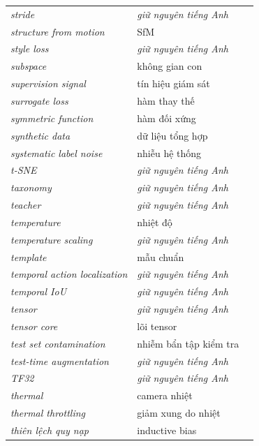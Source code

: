 \documentclass[deep_learning.tex]{subfiles}
\begin{document}
\begin{longtable}{@{}L{5.2cm}L{5.9cm}L{2.6cm}@{}}
\emph{stride} & \emph{\color{tiercol}giữ nguyên tiếng Anh} & \\
\emph{structure from motion} & SfM & \\
\emph{style loss} & \emph{\color{tiercol}giữ nguyên tiếng Anh} & \\
\emph{subspace} & không gian con & \\
\emph{supervision signal} & tín hiệu giám sát & \\
\emph{surrogate loss} & hàm thay thế & \\
\emph{symmetric function} & hàm đối xứng & \\
\emph{synthetic data} & dữ liệu tổng hợp & \\
\emph{systematic label noise} & nhiễu hệ thống & \\
\emph{t-SNE} & \emph{\color{tiercol}giữ nguyên tiếng Anh} & \\
\emph{taxonomy} & \emph{\color{tiercol}giữ nguyên tiếng Anh} & \\
\emph{teacher} & \emph{\color{tiercol}giữ nguyên tiếng Anh} & \\
\emph{temperature} & nhiệt độ & \\
\emph{temperature scaling} & \emph{\color{tiercol}giữ nguyên tiếng Anh} & \\
\emph{template} & mẫu chuẩn & \\
\emph{temporal action localization} & \emph{\color{tiercol}giữ nguyên tiếng Anh} & \\
\emph{temporal IoU} & \emph{\color{tiercol}giữ nguyên tiếng Anh} & \\
\emph{tensor} & \emph{\color{tiercol}giữ nguyên tiếng Anh} & \\
\emph{tensor core} & lõi tensor & \\
\emph{test set contamination} & nhiễm bẩn tập kiểm tra & \\
\emph{test-time augmentation} & \emph{\color{tiercol}giữ nguyên tiếng Anh} & \\
\emph{TF32} & \emph{\color{tiercol}giữ nguyên tiếng Anh} & \\
\emph{thermal} & camera nhiệt & \\
\emph{thermal throttling} & giảm xung do nhiệt & \\
\emph{thiên lệch quy nạp} & inductive bias & \\

\end{longtable}
\end{document}
